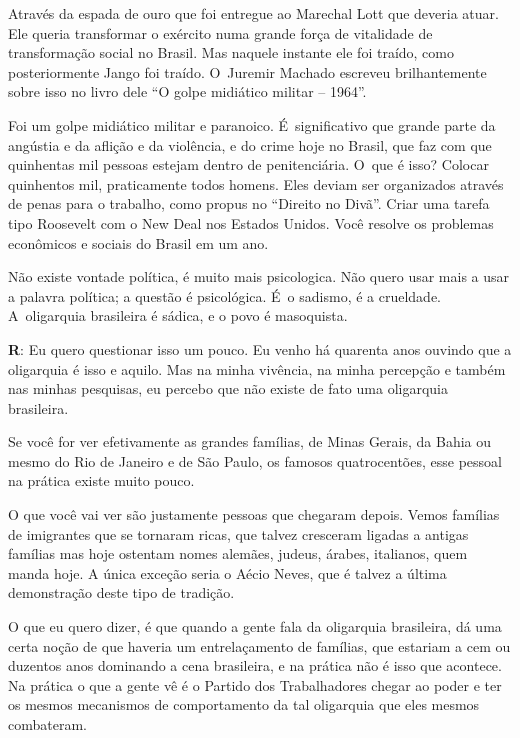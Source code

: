  

Através da espada de ouro que foi entregue ao Marechal Lott que deveria
atuar. Ele queria transformar o exército numa grande força de vitalidade
de transformação social no Brasil. Mas naquele instante ele foi traído,
como posteriormente Jango foi traído. O~Juremir Machado escreveu
brilhantemente sobre isso no livro dele ``O golpe midiático militar --
1964''.

 

Foi um golpe midiático militar e paranoico. É~significativo que grande
parte da angústia e da aflição e da violência, e do crime hoje no
Brasil, que faz com que quinhentas mil pessoas estejam dentro de
penitenciária. O~que é isso? Colocar quinhentos mil, praticamente todos
homens. Eles deviam ser organizados através de penas para o trabalho,
como propus no ``Direito no Divã''. Criar uma tarefa tipo Roosevelt com
o New Deal nos Estados Unidos. Você resolve os problemas econômicos e
sociais do Brasil em um ano.

 

Não existe vontade política, é muito mais psicologica. Não quero usar
mais a usar a palavra política; a questão é psicológica. É~o sadismo, é
a crueldade. A~oligarquia brasileira é sádica, e o povo é masoquista.

 

\textbf{R}: Eu quero questionar isso um pouco. Eu venho há quarenta anos
ouvindo que a oligarquia é isso e aquilo. Mas na minha vivência, na
minha percepção e também nas minhas pesquisas, eu percebo que não existe
de fato uma oligarquia brasileira.

 

Se você for ver efetivamente as grandes famílias, de Minas Gerais, da
Bahia ou mesmo do Rio de Janeiro e de São Paulo, os famosos
quatrocentões, esse pessoal na prática existe muito pouco.

 

O que você vai ver são justamente pessoas que chegaram depois. Vemos
famílias de imigrantes que se tornaram ricas, que talvez cresceram
ligadas a antigas famílias mas hoje ostentam nomes alemães, judeus,
árabes, italianos, quem manda hoje. A única exceção seria o Aécio Neves,
que é talvez a última demonstração deste tipo de tradição.

 

O que eu quero dizer, é que quando a gente fala da oligarquia
brasileira, dá uma certa noção de que haveria um entrelaçamento de
famílias, que estariam a cem ou duzentos anos dominando a cena
brasileira, e na prática não é isso que acontece. Na prática o que a
gente vê é o Partido dos Trabalhadores chegar ao poder e ter os mesmos
mecanismos de comportamento da tal oligarquia que eles mesmos
combateram.

